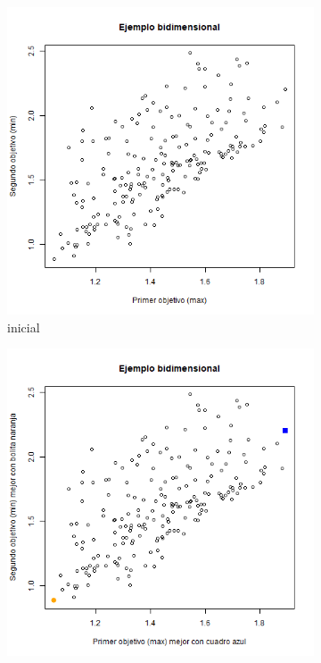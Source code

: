 \documentclass{article}
\begin{document}
\begin{figure}[h!]
\centering
\caption{Frente de Pareto reto 1.}
\begin{subfigure}[b]{0.3\linewidth}
\includegraphics[width=\linewidth]{p11_init.png}
\caption{inicial}
\label{r130}
\end{subfigure}
\begin{subfigure}[b]{0.3\linewidth}
\includegraphics[width=\linewidth]{p11_mejores.png}

\end{subfigure}
\end{figure}
\end{document}
